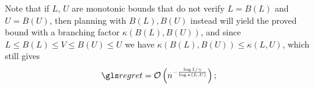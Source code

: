 \begin{subappendices}
Note that if $L,\,U$ are monotonic bounds that do not verify $L = B(L)$ and $U=B(U)$, then planning with $B(L),B(U)$ instead will yield the proved bound with a branching factor $\kappa(B(L),B(U))$, and since $L\leq B(L)\leq V\leq B(U)\leq U$ we have $\kappa(B(L),B(U)) \leq \kappa(L,U)$, which still gives \begin{align*}
\regret = \cO\left(n^{-\frac{\log 1/\gamma}{\log \kappa(L,U)}}\right);
\end{align*}



%
%


\end{subappendices}
